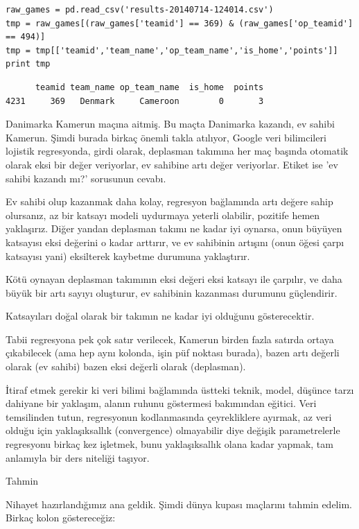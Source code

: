 \documentclass[12pt,fleqn]{article}\usepackage{../../common}
\begin{document}
\begin{verbatim}
raw_games = pd.read_csv('results-20140714-124014.csv')
tmp = raw_games[(raw_games['teamid'] == 369) & (raw_games['op_teamid'] == 494)]
tmp = tmp[['teamid','team_name','op_team_name','is_home','points']]
print tmp
\end{verbatim}

\begin{verbatim}
      teamid team_name op_team_name  is_home  points
4231     369   Denmark     Cameroon        0       3
\end{verbatim}

Danimarka Kamerun maçına aitmiş. Bu maçta Danimarka kazandı, ev sahibi
Kamerun. Şimdi burada birkaç önemli takla atılıyor, Google veri bilimcileri
lojistik regresyonda, girdi olarak, deplasman takımına her maç başında
otomatik olarak eksi bir değer veriyorlar, ev sahibine artı değer
veriyorlar. Etiket ise 'ev sahibi kazandı mı?' sorusunun cevabı.

Ev sahibi olup kazanmak daha kolay, regresyon bağlamında artı değere sahip
olursanız, az bir katsayı modeli uydurmaya yeterli olabilir, pozitife hemen
yaklaşırız. Diğer yandan deplasman takımı ne kadar iyi oynarsa, onun büyüyen
katsayısı eksi değerini o kadar arttırır, ve ev sahibinin artışını (onun
öğesi çarpı katsayısı yani) eksilterek kaybetme durumuna yaklaştırır.

Kötü oynayan deplasman takımının eksi değeri eksi katsayı ile çarpılır, ve daha
büyük bir artı sayıyı oluşturur, ev sahibinin kazanması durumunu güçlendirir.

Katsayıları doğal olarak bir takımın ne kadar iyi olduğunu gösterecektir. 

Tabii regresyona pek çok satır verilecek, Kamerun birden fazla satırda
ortaya çıkabilecek (ama hep aynı kolonda, işin püf noktası burada), bazen
artı değerli olarak (ev sahibi) bazen eksi değerli olarak (deplasman).

İtiraf etmek gerekir ki veri bilimi bağlamında üstteki teknik, model,
düşünce tarzı dahiyane bir yaklaşım, alanın ruhunu göstermesi bakımından
eğitici. Veri temsilinden tutun, regresyonun kodlanmasında çeyrekliklere
ayırmak, az veri olduğu için yaklaşıksallık (convergence) olmayabilir diye
değişik parametrelerle regresyonu birkaç kez işletmek, bunu yaklaşıksallık
olana kadar yapmak, tam anlamıyla bir ders niteliği taşıyor.

Tahmin

Nihayet hazırlandığımız ana geldik. Şimdi dünya kupası maçlarını tahmin
edelim. Birkaç kolon göstereceğiz:
\end{document}
